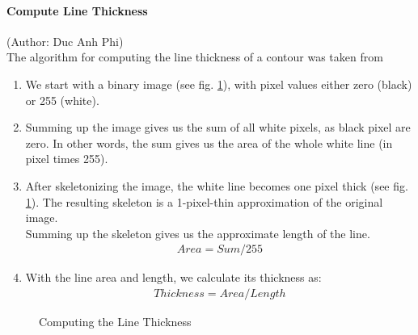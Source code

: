 \documentclass[11pt]{article}
\begin{document}
	\paragraph{Compute Line Thickness}
	\small{(Author: Duc Anh Phi)}\\
	The algorithm for computing the line thickness of a contour was taken from \cite{stackexchange}
	\begin{enumerate}
		\item We start with a binary image (see fig. \ref{fig:linethickness}), with pixel values either zero (black) or 255 (white).
		\item Summing up the image gives us the sum of all white pixels, as black pixel are zero. In other words, the sum gives us the area of the whole white line (in pixel times 255).
		\item After skeletonizing the image, the white line becomes one pixel thick (see fig. \ref{fig:linethickness}). The resulting skeleton is a 1-pixel-thin approximation of the original image.\\
		Summing up the skeleton gives us the approximate length of the line.
		\begin{align}
		Area = Sum/255
		\end{align}
		\item With the line area and length, we calculate its thickness as:
		\begin{align}
		Thickness = Area / Length
		\end{align}
	\end{enumerate}

	\begin{figure}[h!]
		\centering
		\quad
		
		\caption{Computing the Line Thickness}
		\label{fig:linethickness}
	\end{figure}
	
\end{document}
